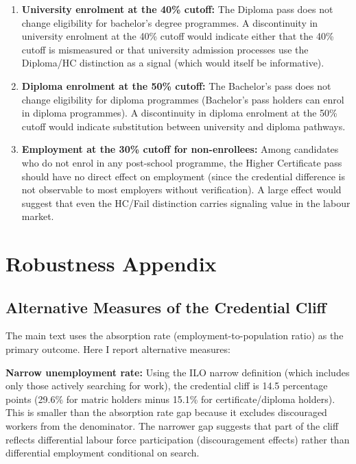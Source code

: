 \documentclass[12pt]{article}
\begin{document}
\begin{enumerate}
    \item \textbf{University enrolment at the 40\% cutoff:} The Diploma pass does not change eligibility for bachelor's degree programmes. A discontinuity in university enrolment at the 40\% cutoff would indicate either that the 40\% cutoff is mismeasured or that university admission processes use the Diploma/HC distinction as a signal (which would itself be informative).

    \item \textbf{Diploma enrolment at the 50\% cutoff:} The Bachelor's pass does not change eligibility for diploma programmes (Bachelor's pass holders can enrol in diploma programmes). A discontinuity in diploma enrolment at the 50\% cutoff would indicate substitution between university and diploma pathways.

    \item \textbf{Employment at the 30\% cutoff for non-enrollees:} Among candidates who do not enrol in any post-school programme, the Higher Certificate pass should have no direct effect on employment (since the credential difference is not observable to most employers without verification). A large effect would suggest that even the HC/Fail distinction carries signaling value in the labour market.
\end{enumerate}


\section{Robustness Appendix}
\label{sec:app_robust}

\subsection{Alternative Measures of the Credential Cliff}

The main text uses the absorption rate (employment-to-population ratio) as the primary outcome. Here I report alternative measures:

\textbf{Narrow unemployment rate:} Using the ILO narrow definition (which includes only those actively searching for work), the credential cliff is 14.5 percentage points (29.6\% for matric holders minus 15.1\% for certificate/diploma holders). This is smaller than the absorption rate gap because it excludes discouraged workers from the denominator. The narrower gap suggests that part of the cliff reflects differential labour force participation (discouragement effects) rather than differential employment conditional on search.
\end{document}
